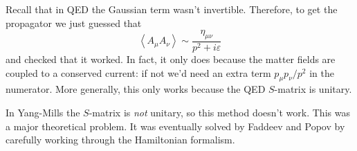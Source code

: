 Recall that in QED the Gaussian term wasn't invertible.
Therefore, to get the propagator we just guessed that
\[
\left \langle A_\mu A_\nu \right \rangle \sim \frac{\eta_{\mu \nu}}{p^2 + i \varepsilon}
\]
and checked that it worked.
In fact, it only does because the matter fields are coupled to a conserved current: if not we'd need an extra term $p_\mu p_\nu/p^2$ in the numerator.
More generally, this only works because the QED $S$-matrix is unitary.

In Yang-Mills the $S$-matrix is \emph{not} unitary, so this method doesn't work.
This was a major theoretical problem.
It was eventually solved by Faddeev and Popov by carefully working through the Hamiltonian formalism.